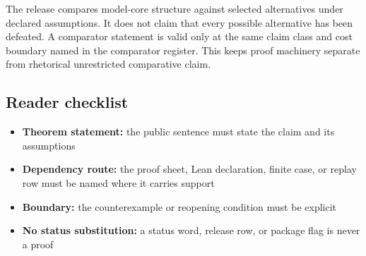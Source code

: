 The release compares model-core structure against selected alternatives under declared assumptions. It does not claim that every possible alternative has been defeated. A comparator statement is valid only at the same claim class and cost boundary named in the comparator register. This keeps proof machinery separate from rhetorical unrestricted comparative claim.


\subsection{Reader checklist}

\begin{itemize}[leftmargin=1.8em]

\item \textbf{Theorem statement:} the public sentence must state the claim and its assumptions

\item \textbf{Dependency route:} the proof sheet, Lean declaration, finite case, or replay row must be named where it carries support

\item \textbf{Boundary:} the counterexample or reopening condition must be explicit

\item \textbf{No status substitution:} a status word, release row, or package flag is never a proof

\end{itemize}
